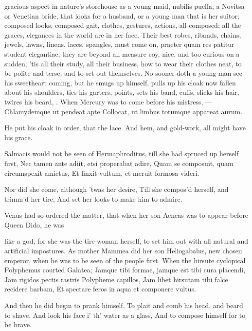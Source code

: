 gracious aspect in nature's storehouse as a young maid, nubilis puella,
a Novitsa or Venetian bride, that looks for a husband, or a young man
that is her suitor; composed looks, composed gait, clothes, gestures,
actions, all composed; all the graces, elegances in the world are in
her face. Their best robes, ribands, chains, jewels, lawns, linens,
laces, spangles, must come on, praeter quam res patitur student
elegantiae, they are beyond all measure coy, nice, and too curious on a
sudden; 'tis all their study, all their business, how to wear their
clothes neat, to be polite and terse, and to set out themselves. No
sooner doth a young man see his sweetheart coming, but he smugs up
himself, pulls up his cloak now fallen about his shoulders, ties his
garters, points, sets his band, cuffs, slicks his hair, twires his
beard, \etc{}. When Mercury was to come before his mistress,
---Chlamydemque ut pendeat apte
Collocat, ut limbus totumque appareat aurum.

He put his cloak in order, that the lace.
And hem, and gold-work, all might have his grace.

Salmacis would not be seen of Hermaphroditus, till she had spruced up
herself first,
Nec tamen ante adiit, etsi properabat adire,
Quam se composuit, quam circumspexit amictus,
Et finxit vultum, et meruit formosa videri.

Nor did she come, although 'twas her desire,
Till she compos'd herself, and trimm'd her tire,
And set her looks to make him to admire.

Venus had so ordered the matter, that when her son Aeneas was to
appear before Queen Dido, he was

like a god, for she was the tire-woman herself, to set him out with all
natural and artificial impostures. As mother Mammea did her son
Heliogabalus, new chosen emperor, when he was to be seen of the people
first. When the hirsute cyclopical Polyphemus courted Galatea;
Jamque tibi formae, jamque est tibi cura placendi,
Jam rigidos pectis rastris Polypheme capillos,
Jam libet hirsutam tibi falce recidere barbam,
Et spectare feros in aqua et componere vultus.

And then he did begin to prank himself,
To plait and comb his head, and beard to shave,
And look his face i' th' water as a glass,
And to compose himself for to be brave.

